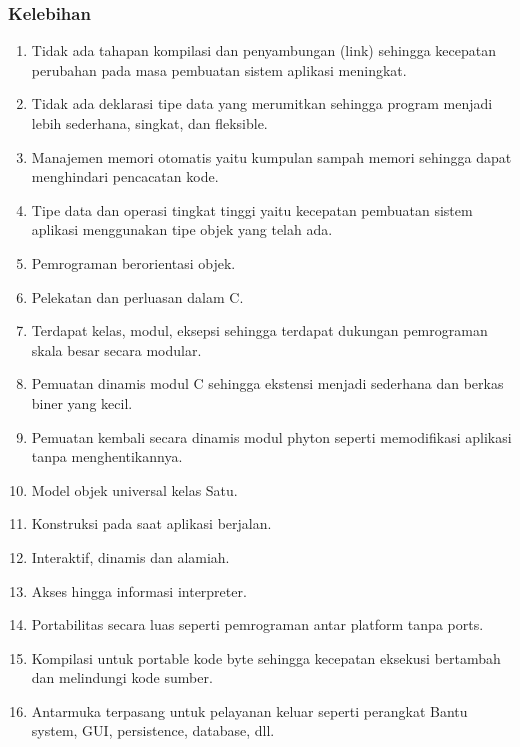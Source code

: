 \subsubsection{Kelebihan}
\begin {enumerate}
\item Tidak ada tahapan kompilasi dan penyambungan (link) sehingga kecepatan perubahan pada masa pembuatan sistem aplikasi meningkat.
\item Tidak ada deklarasi tipe data yang merumitkan sehingga program menjadi lebih sederhana, singkat, dan fleksible.
\item Manajemen memori otomatis yaitu kumpulan sampah memori sehingga dapat menghindari pencacatan kode.
\item Tipe data dan operasi tingkat tinggi yaitu kecepatan pembuatan sistem aplikasi menggunakan tipe objek yang telah ada.
\item Pemrograman berorientasi objek.
\item Pelekatan dan perluasan dalam C.
\item Terdapat kelas, modul, eksepsi sehingga terdapat dukungan pemrograman skala besar secara modular.
\item Pemuatan dinamis modul C sehingga ekstensi menjadi sederhana dan berkas biner yang kecil.
\item Pemuatan kembali secara dinamis modul phyton seperti memodifikasi aplikasi tanpa menghentikannya.
\item Model objek universal kelas Satu.
\item Konstruksi pada saat aplikasi berjalan.
\item Interaktif, dinamis dan alamiah.
\item Akses hingga informasi interpreter.
\item Portabilitas secara luas seperti pemrograman antar platform tanpa ports.
\item Kompilasi untuk portable kode byte sehingga kecepatan eksekusi bertambah dan melindungi kode sumber.
\item Antarmuka terpasang untuk pelayanan keluar seperti perangkat Bantu system, GUI, persistence, database, dll.
\end {enumerate}
